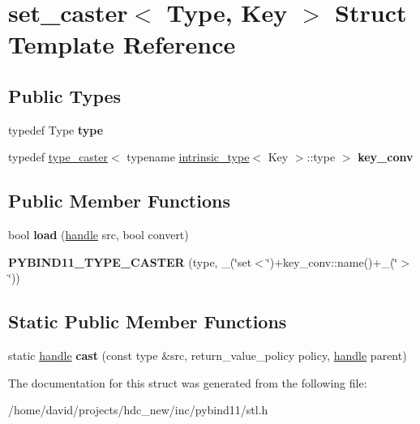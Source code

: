 \hypertarget{structset__caster}{}\section{set\+\_\+caster$<$ Type, Key $>$ Struct Template Reference}
\label{structset__caster}
\subsection*{Public Types}
\begin{DoxyCompactItemize}
\item 
typedef Type {\bfseries type}\hypertarget{structset__caster_a0aafb945af008a818476021f35317a03}{}\label{structset__caster_a0aafb945af008a818476021f35317a03}

\item 
typedef \hyperlink{classtype__caster}{type\+\_\+caster}$<$ typename \hyperlink{structintrinsic__type}{intrinsic\+\_\+type}$<$ Key $>$\+::type $>$ {\bfseries key\+\_\+conv}\hypertarget{structset__caster_afc859c5b6fcf05e6dcd4012567797327}{}\label{structset__caster_afc859c5b6fcf05e6dcd4012567797327}

\end{DoxyCompactItemize}
\subsection*{Public Member Functions}
\begin{DoxyCompactItemize}
\item 
bool {\bfseries load} (\hyperlink{classhandle}{handle} src, bool convert)\hypertarget{structset__caster_ae10b8dc5a37d6e209bbcb94ce7b44c22}{}\label{structset__caster_ae10b8dc5a37d6e209bbcb94ce7b44c22}

\item 
{\bfseries P\+Y\+B\+I\+N\+D11\+\_\+\+T\+Y\+P\+E\+\_\+\+C\+A\+S\+T\+ER} (type, \+\_\+(\char`\"{}set$<$\char`\"{})+key\+\_\+conv\+::name()+\+\_\+(\char`\"{}$>$\char`\"{}))\hypertarget{structset__caster_ac68955093a56b942887ef32eabbdbbed}{}\label{structset__caster_ac68955093a56b942887ef32eabbdbbed}

\end{DoxyCompactItemize}
\subsection*{Static Public Member Functions}
\begin{DoxyCompactItemize}
\item 
static \hyperlink{classhandle}{handle} {\bfseries cast} (const type \&src, return\+\_\+value\+\_\+policy policy, \hyperlink{classhandle}{handle} parent)\hypertarget{structset__caster_a27506ecbf26f79c28a930064e0cc7d52}{}\label{structset__caster_a27506ecbf26f79c28a930064e0cc7d52}

\end{DoxyCompactItemize}


The documentation for this struct was generated from the following file\+:\begin{DoxyCompactItemize}
\item 
/home/david/projects/hdc\+\_\+new/inc/pybind11/stl.\+h\end{DoxyCompactItemize}
